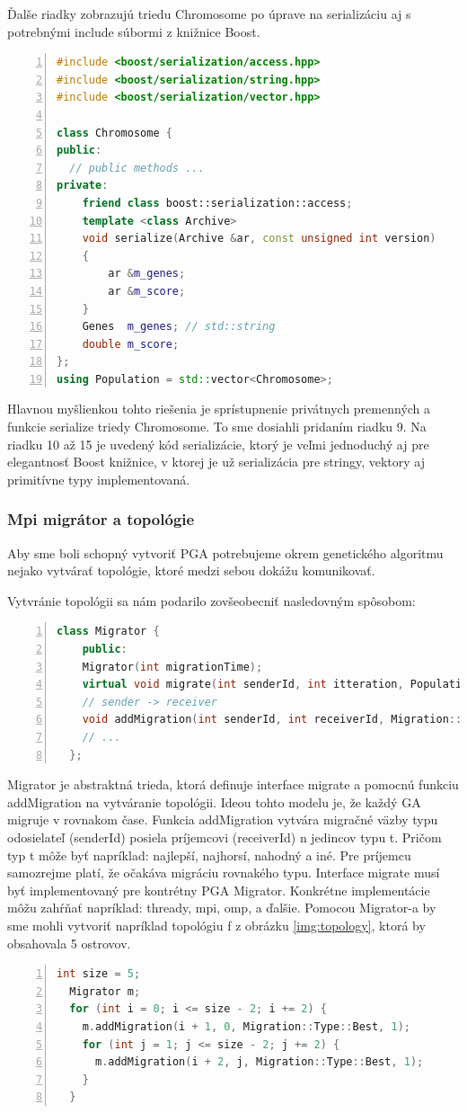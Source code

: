 Ďalše riadky zobrazujú triedu Chromosome po úprave na serializáciu aj s potrebnými include súbormi z knižnice Boost.
\begin{lstlisting}[language={c++}, numbers={left}]
#include <boost/serialization/access.hpp>
#include <boost/serialization/string.hpp>
#include <boost/serialization/vector.hpp>

class Chromosome {
public:
  // public methods ...
private:
    friend class boost::serialization::access;
    template <class Archive>
    void serialize(Archive &ar, const unsigned int version)
    {
        ar &m_genes;
        ar &m_score;
    }
    Genes  m_genes; // std::string
    double m_score;
};
using Population = std::vector<Chromosome>;
\end{lstlisting}
Hlavnou myšlienkou tohto riešenia je sprístupnenie privátnych premenných a funkcie serialize triedy Chromosome. To sme dosiahli pridaním riadku 9.
Na riadku 10 až 15 je uvedený kód serializácie, ktorý je veľmi jednoduchý aj pre elegantnosť Boost knižnice, v ktorej je už serializácia pre stringy, vektory aj primitívne typy implementovaná.

\subsubsection{Mpi migrátor a topológie}
Aby sme boli schopný vytvoriť PGA potrebujeme okrem genetického algoritmu nejako vytvárať topológie, ktoré medzi sebou dokážu komunikovať.

Vytvránie topológii sa nám podarilo zovšeobecniť nasledovným spôsobom:
\begin{lstlisting}[language=c++, caption={Abstrktná trieda Migrator}, numbers={left}]
  class Migrator {
    public:
    Migrator(int migrationTime);
    virtual void migrate(int senderId, int itteration, Population &population) = 0;
    // sender -> receiver
    void addMigration(int senderId, int receiverId, Migration::Type t, int n)
    // ...
  };
\end{lstlisting}
Migrator je abstraktná trieda, ktorá definuje interface migrate a pomocnú funkciu addMigration na vytváranie topológii.
Ideou tohto modelu je, že každý GA migruje v rovnakom čase.
Funkcia addMigration vytvára migračné väzby typu odosielateľ (senderId) posiela príjemcovi (receiverId) n jedincov typu t.
Pričom typ t môže byť napríklad: najlepší, najhorsí, nahodný a iné. Pre príjemcu samozrejme platí, že očakáva migráciu rovnakého typu.
Interface migrate musí  byť implementovaný pre kontrétny PGA Migrator. Konkrétne implementácie môžu zahŕňať napríklad: thready, \acrshort{mpi}, \acrshort{omp},
a ďalšie.
Pomocou Migrator-a by sme mohli vytvoriť napríklad topológiu f z obrázku \ref{img:topology}, ktorá by obsahovala 5 ostrovov.
\begin{lstlisting}[language={c++}, numbers=left]
  int size = 5;
  Migrator m;
  for (int i = 0; i <= size - 2; i += 2) {
    m.addMigration(i + 1, 0, Migration::Type::Best, 1);
    for (int j = 1; j <= size - 2; j += 2) {
      m.addMigration(i + 2, j, Migration::Type::Best, 1);
    }
  }
\end{lstlisting}

